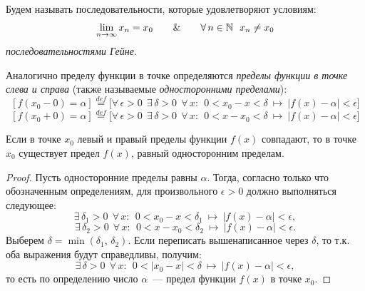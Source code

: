 \begin{note}
Будем называть последовательности, которые удовлетворяют условиям:
\[
\lim\limits_{n \to \infty}{x_{n}} = x_{0} \qquad \&
\qquad \forall \, n \in \mathbb{N} ~~ x_{n} \neq x_{0}
\]
\textit{последовательностями Гейне}.
\end{note}

\begin{definition}
Аналогично пределу функции в точке определяются \textit{пределы функции в точке слева и справа}
(также называемые \textit{односторонними пределами}):
\[
[f(x_{0} - 0) = \alpha] \overset{def}{=} \Big[ \forall \, \epsilon > 0 ~~ \exists \, \delta > 0 ~~
\forall \, x: ~~ 0 < x_{0} - x < \delta ~ \longmapsto ~ |f(x) - \alpha| < \epsilon \Big]
\]
\[
[f(x_{0} + 0) = \alpha] \overset{def}{=} \Big[ \forall \, \epsilon > 0 ~~ \exists \, \delta > 0 ~~
\forall \, x: ~~ 0 < x - x_{0} < \delta ~ \longmapsto ~ |f(x) - \alpha| < \epsilon \Big]
\]
\end{definition}

\begin{statement} \label{statement_side_lims}
Если в точке \(x_{0}\) левый и правый пределы функции \(f(x)\) совпадают,
то в точке \(x_{0}\) существует предел \(f(x)\), равный односторонним пределам.

\begin{proof}
Пусть односторонние пределы равны \(\alpha\). Тогда, согласно только что
обозначенным определениям, для произвольного \(\epsilon > 0\) должно выполняться следующее:
\[
\exists \, \delta_{1} > 0 ~~\forall \, x: ~~ 0 < x_{0} - x < \delta_{1}
~ \longmapsto ~ |f(x) - \alpha| < \epsilon,
\]
\[
\exists \, \delta_{2} > 0 ~~\forall \, x: ~~ 0 < x - x_{0} < \delta_{2}
~ \longmapsto ~ |f(x) - \alpha| < \epsilon.
\]
Выберем \(\delta = \min(\delta_{1}, \, \delta_{2})\). Если переписать вышенаписанное
через \(\delta\), то т.к. оба выражения будут справедливы, получим:
\[
\exists \, \delta > 0 ~~\forall \, x: ~~ 0 < |x_{0} - x| < \delta
~ \longmapsto ~ |f(x) - \alpha| < \epsilon,
\]
то есть по определению число \(\alpha\)~--- предел функции \(f(x)\) в точке \(x_{0}\).
\end{proof}
\end{statement}

